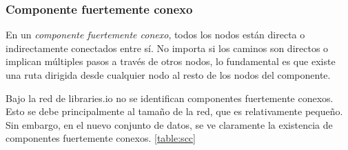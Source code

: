 \subsubsection{Componente fuertemente conexo}

En un \textit{componente fuertemente conexo}, todos los nodos están directa o indirectamente conectados
entre sí. No importa si los caminos son directos o implican múltiples pasos a través de otros nodos,
lo fundamental es que existe una ruta dirigida desde cualquier nodo al resto de los nodos del componente.

Bajo la red de libraries.io no se identifican componentes fuertemente conexos. Esto se debe principalmente
al tamaño de la red, que es relativamente pequeño. Sin embargo, en el nuevo conjunto de datos, se ve claramente
la existencia de componentes fuertemente conexos. \ref{table:scc}

